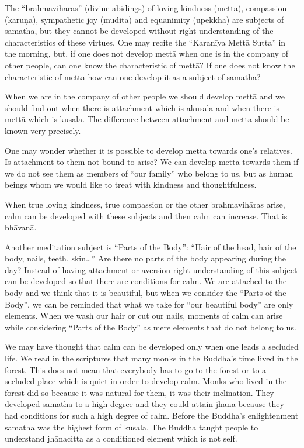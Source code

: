 The ``brahmavihāras'' (divine abidings) of loving kindness (mettā),
compassion (karuṇa), sympathetic joy (muditā) and equanimity (upekkhā)
are subjects of samatha, but they cannot be developed without right
understanding of the characteristics of these virtues. One may recite
the ``Karanīya Mettā Sutta'' in the morning, but, if one does not
develop mettā when one is in the company of other people, can one know
the characteristic of mettā? If one does not know the characteristic of
mettā how can one develop it as a subject of samatha?

When we are in the company of other people we should develop mettā and
we should find out when there is attachment which is akusala and when
there is mettā which is kusala. The difference between attachment and
metta should be known very precisely.

One may wonder whether it is possible to develop mettā towards one's
relatives. Is attachment to them not bound to arise? We can develop
mettā towards them if we do not see them as members of ``our family''
who belong to us, but as human beings whom we would like to treat with
kindness and thoughtfulness.

When true loving kindness, true compassion or the other brahmavihāras
arise, calm can be developed with these subjects and then calm can
increase. That is bhāvanā.

Another meditation subject is ``Parts of the Body'': ``Hair of the head,
hair of the body, nails, teeth, skin\ldots{}'' Are there no parts of the
body appearing during the day? Instead of having attachment or aversion
right understanding of this subject can be developed so that there are
conditions for calm. We are attached to the body and we think that it is
beautiful, but when we consider the ``Parts of the Body'', we can be
reminded that what we take for ``our beautiful body'' are only elements.
When we wash our hair or cut our nails, moments of calm can arise while
considering ``Parts of the Body'' as mere elements that do not belong to
us.

We may have thought that calm can be developed only when one leads a
secluded life. We read in the scriptures that many monks in the Buddha's
time lived in the forest. This does not mean that everybody has to go to
the forest or to a secluded place which is quiet in order to develop
calm. Monks who lived in the forest did so because it was natural for
them, it was their inclination. They developed samatha to a high degree
and they could attain jhāna because they had conditions for such a high
degree of calm. Before the Buddha's enlightenment samatha was the
highest form of kusala. The Buddha taught people to understand
jhānacitta as a conditioned element which is not self.

